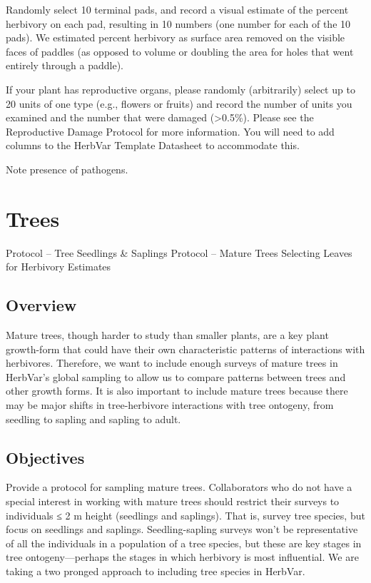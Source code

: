 \documentclass[
  letterpaper,
  DIV=11,
  numbers=noendperiod]{scrreprt}
\begin{document}
Randomly select 10 terminal pads, and record a visual estimate of the
percent herbivory on each pad, resulting in 10 numbers (one number for
each of the 10 pads). We estimated percent herbivory as surface area
removed on the visible faces of paddles (as opposed to volume or
doubling the area for holes that went entirely through a paddle).

If your plant has reproductive organs, please randomly (arbitrarily)
select up to 20 units of one type (e.g., flowers or fruits) and record
the number of units you examined and the number that were damaged
(\textgreater0.5\%). Please see the Reproductive Damage Protocol for
more information. You will need to add columns to the HerbVar Template
Datasheet to accommodate this.

Note presence of pathogens.

\chapter{Trees}\label{sec-tree}

Protocol -- Tree Seedlings \& Saplings Protocol -- Mature Trees
Selecting Leaves for Herbivory Estimates

\section{Overview}\label{overview-3}

Mature trees, though harder to study than smaller plants, are a key
plant growth-form that could have their own characteristic patterns of
interactions with herbivores. Therefore, we want to include enough
surveys of mature trees in HerbVar's global sampling to allow us to
compare patterns between trees and other growth forms. It is also
important to include mature trees because there may be major shifts in
tree-herbivore interactions with tree ontogeny, from seedling to sapling
and sapling to adult.

\section{Objectives}\label{objectives-1}

Provide a protocol for sampling mature trees. Collaborators who do not
have a special interest in working with mature trees should restrict
their surveys to individuals ≤ 2 m height (seedlings and saplings). That
is, survey tree species, but focus on seedlings and saplings.
Seedling-sapling surveys won't be representative of all the individuals
in a population of a tree species, but these are key stages in tree
ontogeny---perhaps the stages in which herbivory is most influential. We
are taking a two pronged approach to including tree species in HerbVar.
\end{document}

